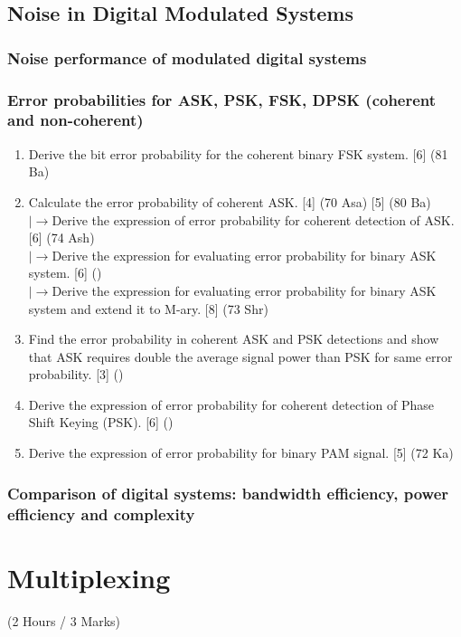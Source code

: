 \documentclass[12pt]{article}
\newcommand{\lb}{\\$\left|\rightarrow\right.$}
\begin{document}
  \subsection{Noise in Digital Modulated Systems}
    \subsubsection{Noise performance of modulated digital systems}
    \subsubsection{Error probabilities for ASK, PSK, FSK, DPSK (coherent and non-coherent)}
    	\begin{enumerate}
    		\item Derive the bit error probability for the coherent binary FSK system. \hfill [6] (81 Ba)
    		
    		\item Calculate the error probability of coherent ASK. \hfill [4] (70 Asa) [5] (80 Ba)
    		\lb Derive the expression of error probability for coherent detection of ASK. \hfill [6] (74 Ash)
    		\lb Derive the expression for evaluating error probability for binary ASK system. \hfill [6] ()
    		\lb Derive the expression for evaluating error probability for binary ASK system and extend it to M-ary. \hfill [8] (73 Shr)
    		
    		\item Find the error probability in coherent ASK and PSK detections and show that ASK requires double the average signal power than PSK for same error probability. \hfill [3] ()
    		
    		\item Derive the expression of error probability for coherent detection of Phase Shift Keying (PSK). \hfill [6] ()
    		
    		\item Derive the expression of error probability for binary PAM signal. \hfill [5] (72 Ka)
    	\end{enumerate}
    
    \subsubsection{Comparison of digital systems: bandwidth efficiency, power efficiency and complexity}

\pagebreak

\section{Multiplexing}
  \begin{center}(2 Hours / 3 Marks)\end{center}
\end{document}
